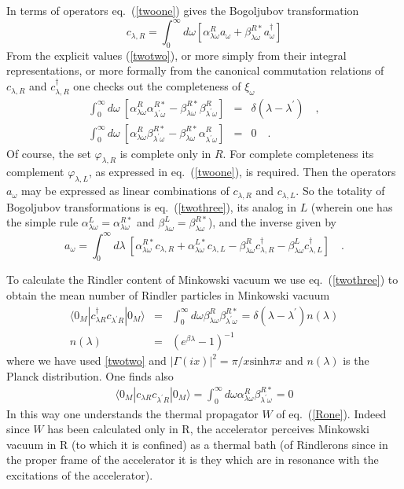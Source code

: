 \documentclass[12pt,oneside]{report}
\def\elematrice#1#2#3{\langle #1|#2|#3 \rangle}
\def\om{\omega	}
\def\la{\lambda}
\begin{document}
In terms of operators eq.~(\ref{twoone}) gives the Bogoljubov
transformation \begin{equation}
c_{\la , R} = \int_0^\infty d \om \left[
\alpha_{\la \om}^R  a_\om +  \beta_{\la \om}^{R *} a_\om^\dagger \right]
\label{twothree}
\end{equation}
\noindent From the explicit values (\ref{twotwo}), or more simply from their
integral representations, or more formally from the canonical commutation
relations of $c_{\la,R}$ and 
$c_{\la,R}^\dagger$ one checks out the completeness of $\xi_\om$
\begin{eqnarray}
\int_0^\infty\! d \om\ 
\left[ \alpha_{\la \om}^R \alpha_{\la^\prime \om}^{R *} -
\beta_{\la \om}^{R *} \beta_{\la^\prime \om}^{R }\right]
&=& \delta(\la - \la^\prime) \quad ,\nonumber\\
\int_0^\infty\! d \om\ 
\left[ \alpha_{\la \om}^R \beta_{\la^\prime \om}^{R *} -
\beta_{\la \om}^{R *} \alpha_{\la^\prime \om}^{R }\right]
&=& 0 \quad .
\label{twofour}
\end{eqnarray}
Of course, the set $\varphi_{\la,R}$ is complete only in $R$. For complete
completeness its complement $\varphi_{\la,L}$, as expressed in
eq.~(\ref{twoone}), is required. Then the operators $a_\om$ may be expressed as
linear combinations of $c_{\la,R}$ and $c_{\la,L}$. So the totality of
Bogoljubov transformations is eq.~(\ref{twothree}), its analog in $L$ (wherein
one has the simple rule 
$\alpha_{\la \om}^L =\alpha_{\la \om}^{R *}$ and 
$\beta_{\la \om}^L =\beta_{\la \om}^{R *}$), and the inverse given by
\begin{equation}
a_\om = \int_0^\infty \! d \la \ 
\left[ \alpha_{\la \om}^{R *} c_{\la,R}
+ \alpha_{\la \om}^{L *} c_{\la,L} - 
\beta_{\la \om}^R c_{\la,R}^\dagger
-\beta_{\la \om}^L c_{\la,L}^\dagger\right] \quad .
\label{twofoura}
\end{equation}

To calculate the Rindler content of Minkowski vacuum  we use
eq.~(\ref{twothree})  to obtain the mean number of Rindler particles in
Minkowski vacuum \begin{eqnarray} \elematrice {0_M}{ c_{\la R}^\dagger
c_{\la^\prime R} }{0_M} &=& \int_0^\infty d \om \beta_{\la \om}^R
\beta_{\la^\prime \om}^{R *} =\delta (\la - \la^\prime) n(\la) \nonumber\\
n(\la) &=& (e^{\beta	\la} -1)^{-1}
\label{twoseven}
\end{eqnarray}
where we have used \ref{twotwo} and $| \Gamma(ix)|^2 =  \pi  / x
\mbox{sinh} \pi x$ and $n(\la)$ is the Planck distribution.
 One finds also
\begin{eqnarray}
\elematrice {0_M}{ c_{\la R}  c_{\la^\prime R} }{0_M} = 
\int_0^\infty d \om \alpha_{\la \om}^R \beta_{\la^\prime \om}^{R *}=0
\label{twosev}
\end{eqnarray}
In this way one understands the thermal propagator $W$ of eq.~(\ref{Rone}).
Indeed since $W$ has been calculated only in R, the accelerator
perceives Minkowski vacuum in R (to which it is confined) as a thermal bath (of
Rindlerons since in the proper frame of the accelerator it is they which are
in resonance with the excitations of the accelerator).
\end{document}
